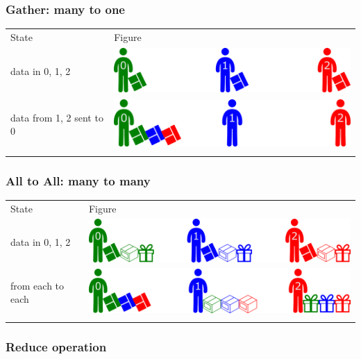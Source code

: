 \subsubsection{Gather: many to one}\label{gather-many-to-one}

\begin{longtable}[c]{@{}ll@{}}
\toprule\addlinespace
State & Figure
\\\addlinespace
\midrule\endhead
data in 0, 1, 2 & \includegraphics{06MPI/figures/collective.png}
\\\addlinespace
data from 1, 2 sent to 0 & \includegraphics{06MPI/figures/gather1.png}
\\\addlinespace
\bottomrule
\end{longtable}

\subsubsection{All to All: many to many}\label{all-to-all-many-to-many}

\begin{longtable}[c]{@{}ll@{}}
\toprule\addlinespace
State & Figure
\\\addlinespace
\midrule\endhead
data in 0, 1, 2 & \includegraphics{06MPI/figures/all2all0.png}
\\\addlinespace
from each to each & \includegraphics{06MPI/figures/all2all1.png}
\\\addlinespace
\bottomrule
\end{longtable}

\subsubsection{Reduce operation}\label{reduce-operation}

